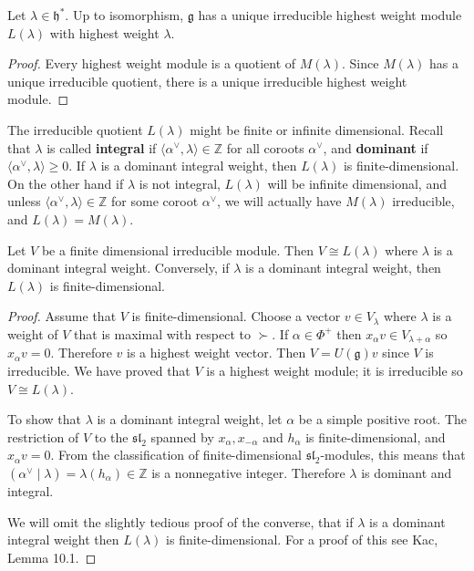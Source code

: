 \documentclass[12pt]{article}
\begin{document}
\begin{corollary}
    Let $\lambda \in \mathfrak{h}^*$. Up to isomorphism, $\mathfrak{g}$ has a unique irreducible highest weight module $L(\lambda)$ with highest weight $\lambda$.
\end{corollary}

\begin{proof}
    Every highest weight module is a quotient of $M(\lambda)$. Since $M(\lambda)$ has a unique irreducible quotient, there is a unique irreducible highest weight module.
\end{proof}

\begin{remark}
    The irreducible quotient $L(\lambda)$ might be finite or infinite dimensional. Recall that $\lambda$ is called \textbf{integral} if $\langle \alpha^\vee, \lambda \rangle \in \mathbb{Z}$ for all coroots $\alpha^\vee$, and \textbf{dominant} if $\langle \alpha^\vee, \lambda \rangle \geq 0$. If $\lambda$ is a dominant integral weight, then $L(\lambda)$ is finite-dimensional. On the other hand if $\lambda$ is not integral, $L(\lambda)$ will be infinite dimensional, and unless $\langle \alpha^\vee, \lambda \rangle \in \mathbb{Z}$ for some coroot $\alpha^\vee$, we will actually have $M(\lambda)$ irreducible, and $L(\lambda) = M(\lambda)$.
\end{remark}


\begin{theorem}\label{thm:fd-classification}
    Let $V$ be a finite dimensional irreducible module. Then
    $V \cong L(\lambda)$ where $\lambda$ is a dominant integral weight.
    Conversely, if $\lambda$ is a dominant integral weight, then $L(\lambda)$
    is finite-dimensional.
\end{theorem}

\begin{proof}
    Assume that $V$ is finite-dimensional. Choose a vector
    $v \in V_\lambda$ where $\lambda$ is a weight of $V$ that is maximal with
    respect to $\succ$. If $\alpha \in \Phi^+$ then
    $x_\alpha v \in V_{\lambda + \alpha}$ so $x_\alpha v = 0$. Therefore $v$
    is a highest weight vector. Then $V = U(\mathfrak{g})v$ since $V$ is
    irreducible. We have proved that $V$ is a highest weight module; it is
    irreducible so $V \cong L(\lambda)$.

    To show that $\lambda$ is a dominant integral weight, let $\alpha$ be a
    simple positive root. The restriction of $V$ to the $\mathfrak{sl}_2$
    spanned by $x_\alpha, x_{-\alpha}$ and $h_\alpha$ is finite-dimensional,
    and $x_\alpha v = 0$. From the classification of finite-dimensional
    $\mathfrak{sl}_2$-modules, this means that
    $(\alpha^\vee \mid \lambda) = \lambda(h_\alpha) \in \mathbb{Z}$ is a
    nonnegative integer. Therefore $\lambda$ is dominant and integral.

    We will omit the slightly tedious proof of the converse, that if $\lambda$ is a dominant integral weight then $L(\lambda)$ is finite-dimensional. For a proof of this see Kac, Lemma 10.1.
\end{proof}
\end{document}
